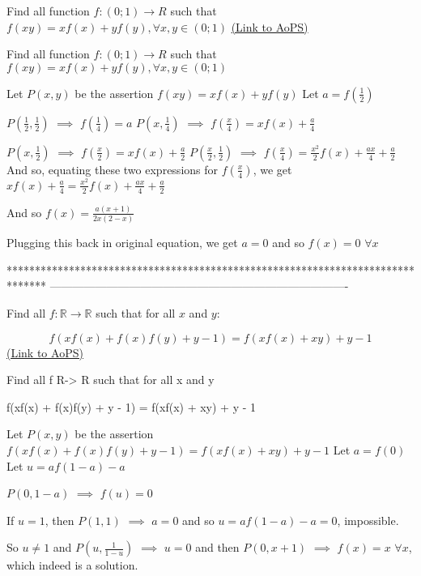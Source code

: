 \begin{problem}
	Find all function $ f:(0;1)\rightarrow R  $  such that
$ f(xy)=xf(x)+yf(y)  ,\forall x,y\in(0;1)$
	\flushright \href{https://artofproblemsolving.com/community/c6h612069}{(Link to AoPS)}
\end{problem}



\begin{solution}
	\begin{tcolorbox}Find all function $ f:(0;1)\rightarrow R  $  such that
$ f(xy)=xf(x)+yf(y)  ,\forall x,y\in(0;1)$\end{tcolorbox}
Let $P(x,y)$ be the assertion $f(xy)=xf(x)+yf(y)$
Let $a=f(\frac 12)$

$P(\frac 12,\frac 12)$ $\implies$ $f(\frac 14)=a$
$P(x,\frac 14)$ $\implies$ $f(\frac x4)=xf(x)+\frac a4$

$P(x,\frac 12)$ $\implies$ $f(\frac x2)=xf(x)+\frac a2$
$P(\frac x2,\frac 12)$ $\implies$ $f(\frac x4)=\frac{x^2}2f(x)+\frac {ax}4+\frac a2$
And so, equating these two expressions for $f(\frac x4)$, we get $xf(x)+\frac a4=\frac{x^2}2f(x)+\frac {ax}4+\frac a2$

And so $f(x)=\frac{a(x+1)}{2x(2-x)}$

Plugging this back in original equation, we get $a=0$ and so $\boxed{f(x)=0}$ $\forall x$
\end{solution}
*******************************************************************************
-------------------------------------------------------------------------------

\begin{problem}
	Find all $f: \mathbb{R}\rightarrow\mathbb{R}$ such that for all $x$ and $y$:

\[f(xf(x) + f(x)f(y) + y - 1) = f(xf(x) + xy) + y - 1\]
	\flushright \href{https://artofproblemsolving.com/community/c6h612312}{(Link to AoPS)}
\end{problem}



\begin{solution}
	\begin{tcolorbox}Find all f R-> R such that for all x and y

f(xf(x) + f(x)f(y) + y - 1) = f(xf(x) + xy) + y - 1\end{tcolorbox}
Let $P(x,y)$ be the assertion $f(xf(x)+f(x)f(y)+y-1)=f(xf(x)+xy)+y-1$
Let $a=f(0)$
Let $u=af(1-a)-a$

$P(0,1-a)$ $\implies$ $f(u)=0$

If $u=1$, then $P(1,1)$ $\implies$ $a=0$ and so $u=af(1-a)-a=0$, impossible.

So $u\ne 1$ and $P(u,\frac 1{1-u})$ $\implies$ $u=0$ and then $P(0,x+1)$ $\implies$ $\boxed{f(x)=x}$ $\forall x$, which indeed is a solution.
\end{solution}



